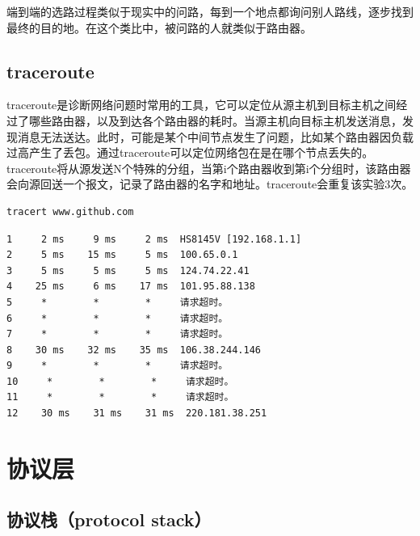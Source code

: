 端到端的选路过程类似于现实中的问路，每到一个地点都询问别人路线，逐步找到最终的目的地。在这个类比中，被问路的人就类似于路由器。\\

\subsection{traceroute}

traceroute是诊断网络问题时常用的工具，它可以定位从源主机到目标主机之间经过了哪些路由器，以及到达各个路由器的耗时。当源主机向目标主机发送消息，发现消息无法送达。此时，可能是某个中间节点发生了问题，比如某个路由器因负载过高产生了丢包。通过traceroute可以定位网络包在是在哪个节点丢失的。\\

traceroute将从源发送N个特殊的分组，当第i个路由器收到第i个分组时，该路由器会向源回送一个报文，记录了路由器的名字和地址。traceroute会重复该实验3次。\\


\begin{lstlisting}
tracert www.github.com
\end{lstlisting}

\begin{tcolorbox}
    \begin{verbatim}
1     2 ms     9 ms     2 ms  HS8145V [192.168.1.1]
2     5 ms    15 ms     5 ms  100.65.0.1
3     5 ms     5 ms     5 ms  124.74.22.41
4    25 ms     6 ms    17 ms  101.95.88.138
5     *        *        *     请求超时。
6     *        *        *     请求超时。
7     *        *        *     请求超时。
8    30 ms    32 ms    35 ms  106.38.244.146
9     *        *        *     请求超时。
10     *        *        *     请求超时。
11     *        *        *     请求超时。
12    30 ms    31 ms    31 ms  220.181.38.251
	\end{verbatim}
\end{tcolorbox}

\newpage

\section{协议层}

\subsection{协议栈（protocol stack）}

